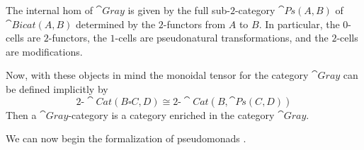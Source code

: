 The internal hom of $\cat{Gray}$ is given by the full sub-$2$-category $\cat{Ps}(A,B)$ of $\cat{Bicat}(A,B)$ determined by the $2$-functors from $A$ to $B$. In particular, the $0$-cells are $2$-functors, the $1$-cells are pseudonatural transformations, and the $2$-cells are modifications.


Now, with these objects in mind the monoidal tensor for the category $\cat{Gray}$ can be defined implicitly by 
\begin{equation*}
    2\text{-}\cat{Cat}(B\square C,D) \cong 2\text{-}\cat{Cat}(B,\cat{Ps}(C,D))
\end{equation*}
Then a $\cat{Gray}$-category is a category enriched in the category $\cat{Gray}$.


We can now begin the formalization of pseudomonads \cite{DAY199799}.

